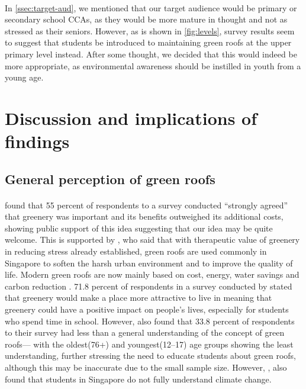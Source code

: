 \documentclass[a4paper]{article}
\begin{document}
\begin{multicols}{2}
  \paragraph{} In \cref{ssec:target-aud}, we mentioned that our target
  audience would be primary or secondary school CCAs, as they would be
  more mature in thought and not as stressed as their seniors. However,
  as is shown in \cref{fig:levels}, survey results seem to suggest that
  students be introduced to maintaining green roofs at the upper primary
  level instead. After some thought, we decided that this would indeed
  be more appropriate, as environmental awareness should be instilled
  in youth from a young age.



  \section{Discussion and implications of findings}
  \subsection{General perception of green roofs}
  \paragraph{} \cite{CommAwareGBSyd} found that 55 percent of
  respondents to a survey conducted ``strongly agreed'' that greenery
  was important and its benefits outweighed its additional costs,
  showing public support of this idea suggesting that our idea may be
  quite welcome. This is supported by \cite{CFGRSG}, who said that with
  therapeutic value of greenery in reducing stress already established,
  green roofs are used commonly in Singapore to soften the harsh
  urban environment and to improve the quality of life. Modern green
  roofs are now mainly based on cost, energy, water savings and carbon
  reduction \parencite{CFGRSG}.  71.8 percent of respondents in a survey
  conducted by \cite{CommAwareGBSyd} stated that greenery would make
  a place more attractive to live in meaning that greenery could have
  a positive impact on people's lives, especially for students who
  spend time in school. However, \cite{GRBuildEnSave} also found that
  33.8 percent of respondents to their survey had less than a general
  understanding of the concept of green roofs--- with the oldest(76+)
  and youngest(12--17) age groups showing the least understanding,
  further stressing the need to educate students about green roofs,
  although this may be inaccurate due to the small sample size. However,
  \cite{student_carbon_footprint}, also found that students in Singapore
  do not fully understand climate change.




\end{multicols}
\end{document}
